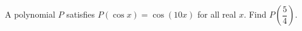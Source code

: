 A polynomial $P$ satisfies $P(\cos x)=\cos(10x)$ for all real $x$. Find $P\left(\dfrac{5}{4}\right)$.
